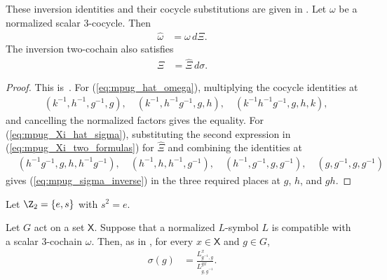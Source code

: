 \begin{lemma}
    \label{thm:mpug_omega_Xi}
    \leanok
    These inversion identities and their cocycle substitutions are given in
    \cite[lines~5967--5979]{FrancoRubio2025MPUGauging}.
    Let $\omega$ be a normalized scalar $3$-cocycle. Then
    \begin{align}
        \widehat\omega & =\omega\,d\Xi.
        \label{eq:mpug_hat_omega}
    \end{align}
    The inversion two-cochain also satisfies
    \begin{align}
        \Xi & =\widehat\Xi\,d\sigma.
        \label{eq:mpug_Xi_hat_sigma}
    \end{align}
\end{lemma}

\begin{proof}\leanok
    This is~\cite[``Inversion identities for a normalized
        three-cocycle'']{QICLean2026Blueprint}.
    For (\ref{eq:mpug_hat_omega}), multiplying the cocycle identities at
    \begin{align}
         & (k^{-1},h^{-1},g^{-1},g),\quad
        (k^{-1},h^{-1}g^{-1},g,h),\quad
        (k^{-1}h^{-1}g^{-1},g,h,k),
    \end{align}
    and cancelling the normalized factors gives the equality. For
    (\ref{eq:mpug_Xi_hat_sigma}), substituting the second expression in
    (\ref{eq:mpug_Xi_two_formulas}) for $\widehat\Xi$ and combining the
    identities at
    \begin{align}
         & (h^{-1}g^{-1},g,h,h^{-1}g^{-1}),\quad
        (h^{-1},h,h^{-1},g^{-1}),\quad
        (h^{-1},g^{-1},g,g^{-1}),\quad
        (g,g^{-1},g,g^{-1})
    \end{align}
    gives (\ref{eq:mpug_sigma_inverse}) in the three required places at $g$,
    $h$, and $gh$.
\end{proof}

Let $\Z_2=\{e,s\}$ with $s^2=e$.

\begin{lemma}
    \label{thm:mpug_sigma_l_ratio}
    \leanok
    Let $G$ act on a set $\mathsf X$. Suppose that a normalized $L$-symbol
    $L$ is compatible with a scalar $3$-cochain $\omega$. Then, as in
    \cite[lines~5327--5329]{FrancoRubio2025MPUGauging}, for every
    $x\in\mathsf X$ and $g\in G$,
    \begin{align}
        \sigma(g)
         & =\frac{L^x_{g^{-1},g}}{L^{g x}_{g,g^{-1}}}.
        \label{eq:mpug_sigma_l_ratio}
    \end{align}
\end{lemma}

